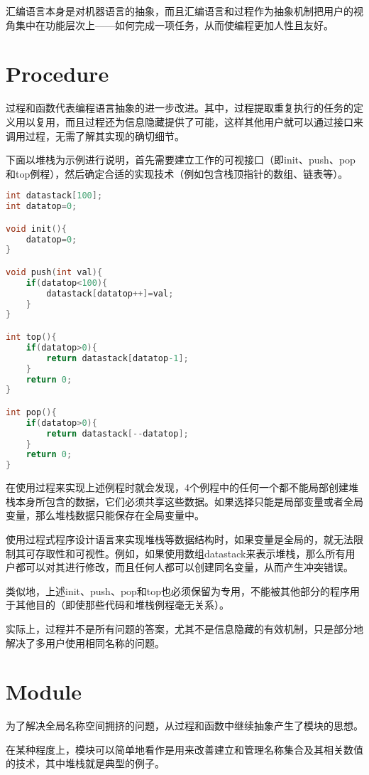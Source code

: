 汇编语言本身是对机器语言的抽象，而且汇编语言和过程作为抽象机制把用户的视角集中在功能层次上——如何完成一项任务，从而使编程更加人性且友好。


\section{Procedure}

过程和函数代表编程语言抽象的进一步改进。其中，过程提取重复执行的任务的定义用以复用，而且过程还为信息隐藏提供了可能，这样其他用户就可以通过接口来调用过程，无需了解其实现的确切细节。

下面以堆栈为示例进行说明，首先需要建立工作的可视接口（即init、push、pop和top例程），然后确定合适的实现技术（例如包含栈顶指针的数组、链表等）。



\begin{lstlisting}[language=C]
int datastack[100];
int datatop=0;

void init(){
	datatop=0;
}

void push(int val){
	if(datatop<100){
		datastack[datatop++]=val;
	}
}

int top(){
	if(datatop>0){
		return datastack[datatop-1];
	}
	return 0;
}

int pop(){
	if(datatop>0){
		return datastack[--datatop];
	}
	return 0;
}
\end{lstlisting}

在使用过程来实现上述例程时就会发现，4个例程中的任何一个都不能局部创建堆栈本身所包含的数据，它们必须共享这些数据。如果选择只能是局部变量或者全局变量，那么堆栈数据只能保存在全局变量中。

使用过程式程序设计语言来实现堆栈等数据结构时，如果变量是全局的，就无法限制其可存取性和可视性。例如，如果使用数组datastack来表示堆栈，那么所有用户都可以对其进行修改，而且任何人都可以创建同名变量，从而产生冲突错误。

类似地，上述init、push、pop和top也必须保留为专用，不能被其他部分的程序用于其他目的（即使那些代码和堆栈例程毫无关系）。

实际上，过程并不是所有问题的答案，尤其不是信息隐藏的有效机制，只是部分地解决了多用户使用相同名称的问题。


\section{Module}


为了解决全局名称空间拥挤的问题，从过程和函数中继续抽象产生了模块的思想。

在某种程度上，模块可以简单地看作是用来改善建立和管理名称集合及其相关数值的技术，其中堆栈就是典型的例子。

